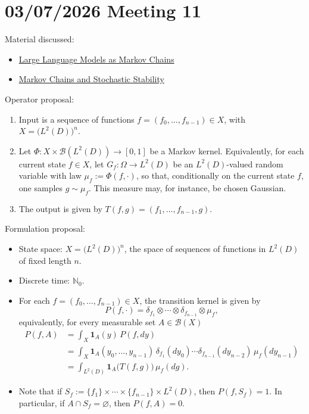 \documentclass{article}
\begin{document}
\section{03/07/2026 Meeting 11}
Material discussed:
\begin{itemize}
    \item \href{https://arxiv.org/abs/2410.02724}{Large Language Models as Markov Chains}
    \item \href{https://www.cambridge.org/core/books/markov-chains-and-stochastic-stability/E2B82BFB409CD2F7D67AFC5390C565EC}{Markov Chains and Stochastic Stability}
\end{itemize}
Operator proposal:
\begin{enumerate}
    \item Input is a sequence of functions $f = (f_0,\ldots,f_{n-1}) \in X$, with $X = \bigl(L^2(D)\bigr)^n$.
    \item Let $\Phi : X \times \mathcal{B}(L^2(D)) \to [0,1]$ be a Markov kernel. Equivalently, for each current state $f \in X$, let $G_f : \Omega \to L^2(D)$ be an $L^2(D)$-valued random variable with law $\mu_f := \Phi(f,\cdot)$, so that, conditionally on the current state $f$, one samples $g \sim \mu_f$. This measure may, for instance, be chosen Gaussian.
    \item The output is given by $T(f,g) = (f_1,\ldots,f_{n-1},g)$.
\end{enumerate}
Formulation proposal:
\begin{itemize}
    \item State space: $X = \bigl(L^2(D)\bigr)^n$, the space of sequences of functions in $L^2(D)$ of fixed length $n$.
    \item Discrete time: $\mathbb{N}_0$.
    \item For each $f=(f_0,\ldots,f_{n-1}) \in X$, the transition kernel is given by
    \begin{equation*}
    P(f,\cdot) = \delta_{f_1} \otimes \cdots \otimes \delta_{f_{n-1}} \otimes \mu_f,
    \end{equation*}
    equivalently, for every measurable set $A \in \mathcal{B}(X)$
    \begin{align*}
        P(f,A) &= \int_X \mathbf{1}_A(y)\,P(f,dy)\\
        &= \int_X \mathbf{1}_A(y_0,\ldots,y_{n-1})\,\delta_{f_1}(dy_0)\cdots\delta_{f_{n-1}}(dy_{n-2})\,\mu_f(dy_{n-1})\\
        &= \int_{L^2(D)} \mathbf{1}_A\bigl(T(f,g)\bigr)\,\mu_f(dg).
    \end{align*}
    \item Note that if $S_f := \{f_1\} \times \cdots \times \{f_{n-1}\} \times L^2(D)$, then $P(f,S_f)=1$. In particular, if $A \cap S_f = \varnothing$, then $P(f,A)=0$.
\end{itemize}
\end{document}
